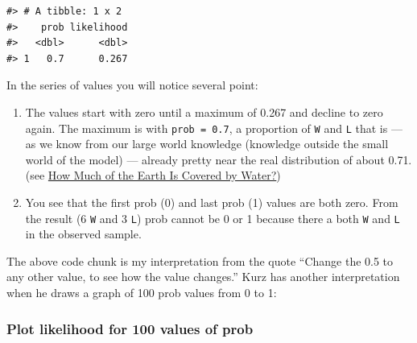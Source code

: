 \documentclass[
  letterpaper,
  DIV=11,
  numbers=noendperiod]{scrreprt}
\providecommand{\tightlist}{%
  \setlength{\itemsep}{0pt}\setlength{\parskip}{0pt}}\usepackage{longtable,booktabs,array}
\begin{document}
\begin{verbatim}
#> # A tibble: 1 x 2
#>    prob likelihood
#>   <dbl>      <dbl>
#> 1   0.7      0.267
\end{verbatim}

In the series of values you will notice several point:

\begin{enumerate}
\def\labelenumi{\arabic{enumi}.}
\tightlist
\item
  The values start with zero until a maximum of 0.267 and decline to
  zero again. The maximum is with \texttt{prob\ =\ 0.7}, a proportion of
  \texttt{W} and \texttt{L} that is --- as we know from our large world
  knowledge (knowledge outside the small world of the model) --- already
  pretty near the real distribution of about 0.71. (see
  \href{https://www.thedailyeco.com/how-much-of-the-earth-is-covered-by-water-122.html}{How
  Much of the Earth Is Covered by Water?})
\item
  You see that the first prob (0) and last prob (1) values are both
  zero. From the result (6 \texttt{W} and 3 \texttt{L}) prob cannot be 0
  or 1 because there a both \texttt{W} and \texttt{L} in the observed
  sample.
\end{enumerate}

The above code chunk is my interpretation from the quote ``Change the
0.5 to any other value, to see how the value changes.'' Kurz has another
interpretation when he draws a graph of 100 prob values from 0 to 1:

\hypertarget{sec-likelihood-for-many-p-values-b}{%
\subsubsection{Plot likelihood for 100 values of
prob}\label{sec-likelihood-for-many-p-values-b}}
\end{document}
